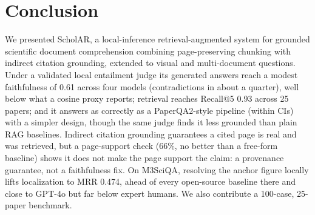 \documentclass[11pt,letterpaper]{article}
\begin{document}
\section{Conclusion}
We presented ScholAR, a local-inference retrieval-augmented system for grounded scientific
document comprehension combining page-preserving chunking with indirect citation grounding,
extended to visual and multi-document questions. Under a validated local entailment judge its
generated answers reach a modest faithfulness of 0.61 across four models (contradictions in about a
quarter), well below what a cosine proxy reports; retrieval reaches Recall@5 0.93 across 25 papers;
and it answers as correctly as a PaperQA2-style pipeline (within CIs) with a simpler design, though
the same judge finds it less grounded than plain RAG baselines. Indirect citation grounding guarantees a cited page is real and was retrieved, but a
page-support check (66\%, no better than a free-form baseline) shows it does not make the page
support the claim: a provenance guarantee, not a faithfulness fix. On M3SciQA, resolving the anchor
figure locally lifts localization to MRR 0.474, ahead of every open-source baseline there and close
to GPT-4o but far below expert humans. We also contribute a 100-case, 25-paper benchmark.



\end{document}
